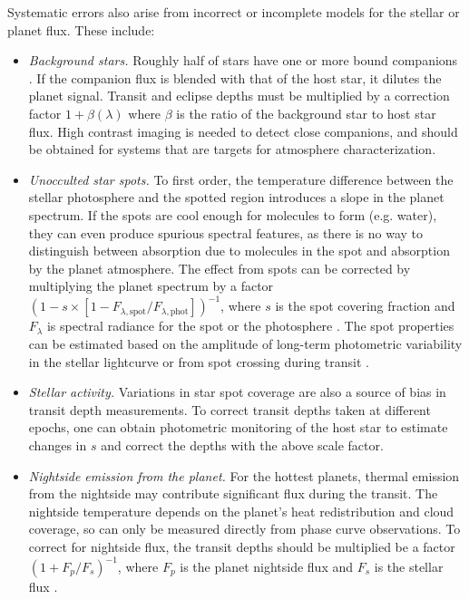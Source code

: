 \documentclass[graybox,natbib,nosecnum]{svmult}
\begin{document}
Systematic errors also arise from incorrect or incomplete models for the stellar or planet flux. These include: 

\begin{itemize}
\item{\emph{Background stars.} Roughly half of stars have one or more bound companions \citep{raghavan10}. If the companion flux is blended with that of the host star, it dilutes the planet signal. Transit and eclipse depths must be multiplied by a correction factor $1 + \beta(\lambda)$ where $\beta$ is the ratio of the background star to host star flux. High contrast imaging is needed to detect close companions, and should be obtained for systems that are targets for atmosphere characterization.}
\item{\emph{Unocculted star spots.} To first order, the temperature difference between the stellar photosphere and the spotted region introduces a slope in the planet spectrum. If the spots are cool enough for molecules to form (e.g. water), they can even produce spurious spectral features, as there is no way to distinguish between absorption due to molecules in the spot and absorption by the planet atmosphere. The effect from spots can be corrected by multiplying the planet spectrum by a factor $(1-s\times[1-F_{\lambda,\mathrm{spot}}/F_{\lambda,\mathrm{phot}}])^{-1}$, where $s$ is the spot covering fraction and $F_\lambda$ is spectral radiance for the spot or the photosphere \citep{mccullough14}. The spot properties can be estimated based on the amplitude of long-term photometric variability in the stellar lightcurve or from spot crossing during transit \citep[e.g.][]{pont08}.} 
\item{\emph{Stellar activity.} Variations in star spot coverage are also a source of bias in transit depth measurements. To correct transit depths taken at different epochs, one can obtain photometric monitoring of the host star to estimate changes in $s$ and correct the depths with the above scale factor.} 
\item{\emph{Nightside emission from the planet.} For the hottest planets, thermal emission from the nightside may contribute significant flux during the transit. The nightside temperature depends on the planet's heat redistribution and cloud coverage, so can only be measured directly from phase curve observations. To correct for nightside flux, the transit depths should be multiplied be a factor $(1 + F_p/F_s)^{-1}$, where $F_p$ is the planet nightside flux and $F_s$ is the stellar flux \citep{kipping10}.} 
\end{itemize}
\end{document}
